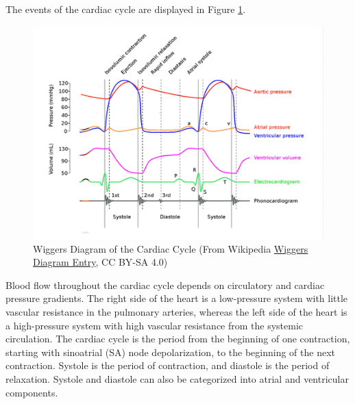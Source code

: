 The events of the cardiac cycle are displayed in Figure \ref{fig:Cardiac_Wiggers}. 
\begin{figure}[!h]
    \centering
    \includegraphics[width=1\linewidth]{./figure/Cardiac_Wiggers.png}
    \caption{Wiggers Diagram of the Cardiac Cycle \footnotesize{(From Wikipedia  \href{https://en.wikipedia.org/wiki/Wiggers_diagram}{Wiggers Diagram Entry}, CC BY-SA 4.0)}}
    \label{fig:Cardiac_Wiggers}
\end{figure}

Blood flow throughout the cardiac cycle depends on circulatory and cardiac pressure gradients. The right side of the heart is a low-pressure system with little vascular resistance in the pulmonary arteries, whereas the left side of the heart is a high-pressure system with high vascular resistance from the systemic circulation. The cardiac cycle is the period from the beginning of one contraction, starting with sinoatrial (SA) node depolarization, to the beginning of the next contraction. Systole is the period of contraction, and diastole is the period of relaxation. Systole and diastole can also be categorized into atrial and ventricular components.

